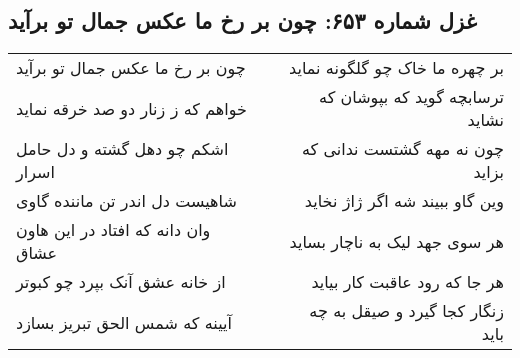 \begin{center}
\section*{غزل شماره ۶۵۳: چون بر رخ ما عکس جمال تو برآید}
\label{sec:0653}
\begin{longtable}{l p{0.5cm} r}
چون بر رخ ما عکس جمال تو برآید
&&
بر چهره ما خاک چو گلگونه نماید
\\
خواهم که ز زنار دو صد خرقه نماید
&&
ترسابچه گوید که بپوشان که نشاید
\\
اشکم چو دهل گشته و دل حامل اسرار
&&
چون نه مهه گشتست ندانی که بزاید
\\
شاهیست دل اندر تن ماننده گاوی
&&
وین گاو ببیند شه اگر ژاژ نخاید
\\
وان دانه که افتاد در این هاون عشاق
&&
هر سوی جهد لیک به ناچار بساید
\\
از خانه عشق آنک بپرد چو کبوتر
&&
هر جا که رود عاقبت کار بیاید
\\
آیینه که شمس الحق تبریز بسازد
&&
زنگار کجا گیرد و صیقل به چه باید
\\
\end{longtable}
\end{center}

